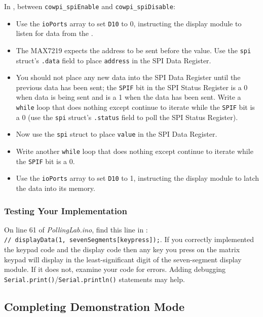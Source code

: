 In , between \lstinline{cowpi_spiEnable} and
\lstinline{cowpi_spiDisable}:
    \begin{itemize}
    \item Use the \lstinline{ioPorts} array to set \texttt{D10} to 0, instructing the display module to listen for data from the \nano.
    \item The MAX7219 expects the address to be sent before the value. Use the
        \lstinline{spi} struct's \lstinline{.data} field to place
        \lstinline{address} in the SPI Data Register.
    \item You should not place any new data into the SPI Data Register until
        the previous data has been sent; the \texttt{SPIF} bit in the SPI
        Status Register is a 0 when data is being sent and is a 1 when the data
        has been sent. Write a \lstinline{while} loop that does nothing except
        continue to iterate while the \texttt{SPIF} bit is a 0 (use the
        \lstinline{spi} struct's \lstinline{.status} field to poll the SPI
        Status Register).
    \item Now use the \lstinline{spi} struct to place \lstinline{value} in the
        SPI Data Register.
    \item Write another \lstinline{while} loop that does nothing except
        continue to iterate while the \texttt{SPIF} bit is a 0.
    \item Use the \lstinline{ioPorts} array to set \texttt{D10} to 1,
        instructing the display module to latch the data into its memory.
    \end{itemize}

\subsubsection{Testing Your Implementation}

On line 61 of \textit{PollingLab.ino}, find this line in : \\
\lstinline{// displayData(1, sevenSegments[keypress]);}. If you correctly
implemented the keypad code and the display code then any key you press on the
matrix keypad will display in the least-significant digit of the seven-segment
display module. If it does not, examine your code for errors. Adding debugging
\lstinline{Serial.print()}/\lstinline{Serial.println()} statements may help.

\subsection{Completing Demonstration Mode}

